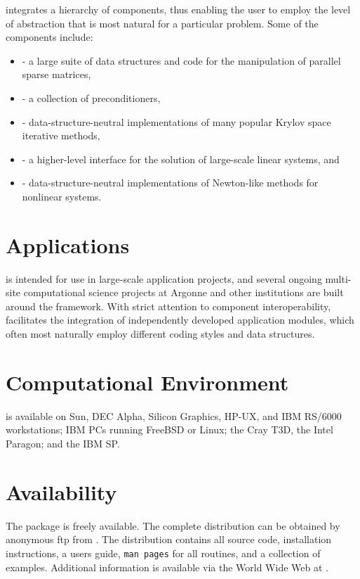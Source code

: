 integrates a hierarchy of components, thus
enabling the user to employ the level of abstraction that is most
natural for a particular problem.  Some of the components include:
\vspace{-.4cm}
\begin{itemize}
\item {} - a large suite of data structures and code
      for the manipulation of parallel sparse matrices,
\vsp
\item {} - a collection of preconditioners,
\vsp
\item {} - data-structure-neutral implementations of
      many popular Krylov space iterative methods,
\vsp
\item {} - a higher-level interface for the solution of
      large-scale linear systems, and
\vsp
\item {} - data-structure-neutral implementations of Newton-like
      methods for nonlinear systems.
\end{itemize}
\vspace{-.3cm}

\section*{Applications}
 is intended for use in large-scale application projects, and
several ongoing multi-site computational science projects at Argonne
and other institutions are built around the  framework.
With strict attention to component interoperability, 
facilitates the integration of independently developed application
modules, which often most naturally employ different coding styles and
data structures. 

\section*{Computational Environment}
 is available on Sun, DEC Alpha, Silicon Graphics, HP-UX, and IBM
RS/6000 workstations; IBM PCs running FreeBSD or Linux; the Cray T3D,
the Intel Paragon; and the IBM SP.

\section*{Availability}

The  package is freely available.
The complete distribution can be obtained by anonymous ftp from 
.
The  distribution contains all source code, installation
instructions, a users guide, {\tt man pages} for all routines, and a
collection of examples.  Additional information is available via the
World Wide Web at
.

\vspace{-.1cm}
\makeinfo

